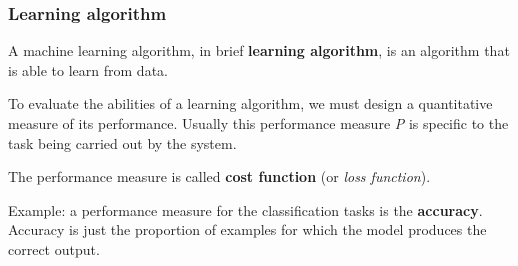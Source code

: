 \documentclass{beamer}
\begin{document}
	\begin{frame}
		\frametitle{Learning algorithm}
		A machine learning algorithm, in brief \textbf{learning algorithm}, is an algorithm that is able to learn from data.
		
		\vspace{5mm}
		
		To evaluate the abilities of a learning algorithm, we must design a quantitative measure of its performance. Usually this performance measure \textit{P} is speciﬁc to the task being carried out by the system.
		
		\vspace{5mm}
		
		The performance measure is called \textbf{cost function} (or \textsl{loss function}).
		
		\vspace{5mm}
		
		Example: a performance measure for the classification tasks is the \textbf{accuracy}. Accuracy is just the proportion of examples for which the model produces the correct output.
	\end{frame}


	
	
\end{document}
